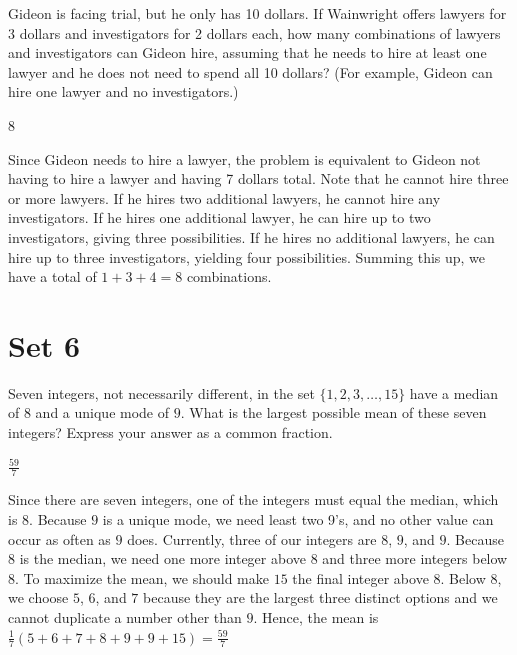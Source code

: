 \documentclass[11pt]{article}
\begin{document}
\begin{problem}
Gideon is facing trial, but he only has 10 dollars. If Wainwright offers lawyers for 3 dollars and investigators for 2 dollars each, 
how many combinations of lawyers and investigators can Gideon hire, assuming that he needs to hire at least one lawyer and he does not 
need to spend all 10 dollars? (For example, Gideon can hire one lawyer and no investigators.)
\end{problem}

\begin{answer}
8
\end{answer}

\begin{solution}
Since Gideon needs to hire a lawyer, the problem is equivalent to Gideon not having to hire a lawyer and having 7 dollars total. 
Note that he cannot hire three or more lawyers. If he hires two additional lawyers, he cannot hire any investigators. 
If he hires one additional lawyer, he can hire up to two investigators, giving three possibilities. 
If he hires no additional lawyers, he can hire up to three investigators, yielding four possibilities. 
Summing this up, we have a total of $1+3+4=\boxed{8}$ combinations.
\end{solution}


\newpage
\section*{Set 6}
\begin{problem}
Seven integers, not necessarily different, in the set $\{1, 2, 3, \ldots, 15\}$ have a median of $8$ and a unique mode of $9$. What is the largest possible mean of these seven integers? Express your answer as a common fraction.%
\end{problem}

\begin{answer}
$\frac{59}{7}$
\end{answer}

\begin{solution}
Since there are seven integers, one of the integers must equal the median, which is $8$. Because $9$ is a unique mode, we need least two 9's, and no other value can occur as often as $9$ does. Currently, three of our integers are $8$, $9$, and $9$. Because $8$ is the median, we need one more integer above $8$ and three more integers below $8$. To maximize the mean, we should make $15$ the final integer above $8$. Below $8$, we choose $5$, $6$, and $7$ because they are the largest three distinct options and we cannot duplicate a number other than $9$. Hence, the mean is $\frac{1}{7}(5 + 6 + 7 + 8 + 9 + 9 + 15) = \boxed{\frac{59}{7}}$
\end{solution}
\end{document}
